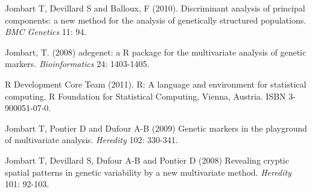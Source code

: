 \documentclass{article}
\begin{document}
\begin{thebibliography}{9}

  Jombart T, Devillard S and Balloux, F (2010).
  Discriminant analysis of principal components: a new method for the analysis of genetically structured populations.
  \textit{BMC Genetics} 11: 94.

  Jombart, T. (2008) adegenet: a R package for the multivariate
  analysis of genetic markers. \textit{Bioinformatics} 24: 1403-1405.

  R Development Core Team (2011). R: A language and environment for
  statistical computing. R Foundation for Statistical Computing,
  Vienna, Austria. ISBN 3-900051-07-0.

  Jombart T, Pontier D and Dufour A-B (2009) Genetic markers in the playground of multivariate analysis.
  \textit{Heredity} 102: 330-341.

Jombart T, Devillard S, Dufour A-B and Pontier D (2008) Revealing cryptic spatial patterns in genetic variability by a new multivariate method.
\textit{Heredity} 101: 92-103.

\end{thebibliography}
\end{document}

